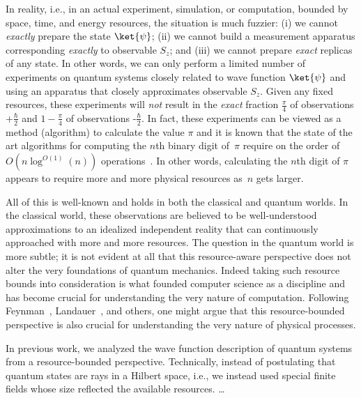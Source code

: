\documentclass[12pt]{iopart}
\theoremstyle{plain}
\theoremstyle{definition}
\theoremstyle{remark}
\newcommand{\ps}{\texttt{+}}
\newcommand{\minus}{\texttt{-}}
\begin{document}
In reality, i.e., in an actual experiment, simulation, or computation,
bounded by space, time, and energy resources, the situation is much
fuzzier: (i) we cannot \emph{exactly} prepare the state $\ket{\psi}$;
(ii) we cannot build a measurement apparatus corresponding
\emph{exactly} to observable $S_z$; and (iii) we cannot prepare
\emph{exact} replicas of any state. In other words, we can only
perform a limited number of experiments on quantum systems closely
related to wave function $\ket{\psi}$ and using an apparatus that
closely approximates observable $S_z$. Given any fixed resources,
these experiments will \emph{not} result in the \emph{exact} fraction
$\frac{\pi}{4}$ of observations $\ps\frac{\hbar}{2}$ and
$1-\frac{\pi}{4}$ of observations $\minus\frac{\hbar}{2}$. In fact,
these experiments can be viewed as a method (algorithm) to calculate
the value $\pi$ and it is known that the state of the art algorithms
for computing the $n$th binary digit of~$\pi$ require on the order of
$O\left(n\log^{O\left(1\right)}\left(n\right)\right)$
operations~\cite{journals/moc/BaileyBP97}. In other words, calculating
the $n$th digit of $\pi$ appears to require more and more physical
resources as~$n$ gets larger.

All of this is well-known and holds in both the classical and quantum
worlds. In the classical world, these observations are believed to be
well-understood approximations to an idealized independent reality
that can continuously approached with more and more resources. The
question in the quantum world is more subtle; it is not evident at all
that this resource-aware perspective does not alter the very
foundations of quantum mechanics. Indeed taking such resource bounds
into consideration is what founded computer science as a discipline
and has become crucial for understanding the very nature of
computation. Following Feynman~\cite{Feynman1982Simulating},
Landauer~\cite{Landauer1996188}, and others, one might argue that this
resource-bounded perspective is also crucial for understanding the
very nature of physical processes.

In previous work, we analyzed the wave function description of quantum
systems from a resource-bounded perspective. Technically, instead of
postulating that quantum states are rays in a Hilbert space, i.e., we
instead used special finite fields whose size reflected the available
resources. \ldots

\newpage
\end{document}
